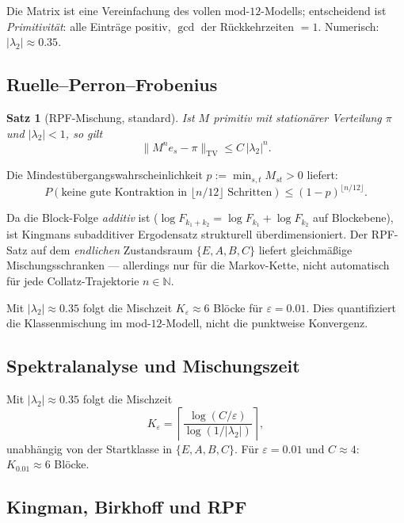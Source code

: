 \documentclass[12pt,a4paper]{article}
\newtheorem{satz}{Satz}[section]
\newcommand{\N}{\mathbb{N}}
\newcommand{\TV}{\mathrm{TV}}
\begin{document}
\begin{tcolorbox}[heuristik]
Die Matrix ist eine Vereinfachung des vollen mod-$12$-Modells;
entscheidend ist \emph{Primitivität}: alle Einträge positiv,
$\gcd$ der Rückkehrzeiten $= 1$.
Numerisch: $|\lambda_2| \approx 0.35$.
\end{tcolorbox}

\subsection{Ruelle--Perron--Frobenius}

\begin{satz}[RPF-Mischung, standard]
Ist $M$ primitiv mit stationärer Verteilung $\pi$ und $|\lambda_2| < 1$, so gilt
\[
  \|M^n e_s - \pi\|_{\TV} \leq C\,|\lambda_2|^n.
\]
\end{satz}

Die Mindestübergangswahrscheinlichkeit $p := \min_{s,t} M_{st} > 0$ liefert:
\[
  P(\text{keine gute Kontraktion in } \lfloor n/12 \rfloor \text{ Schritten})
  \leq (1-p)^{\lfloor n/12 \rfloor}.
\]

\begin{tcolorbox}[kern]
Da die Block-Folge \emph{additiv} ist ($\log F_{k_1+k_2} = \log F_{k_1} + \log F_{k_2}$
auf Blockebene), ist Kingmans subadditiver Ergodensatz strukturell
überdimensioniert. Der RPF-Satz auf dem \emph{endlichen} Zustandsraum
$\{E,A,B,C\}$ liefert gleichmäßige Mischungsschranken --- allerdings nur
für die Markov-Kette, nicht automatisch für jede Collatz-Trajektorie
$n \in \N$.
\end{tcolorbox}

Mit $|\lambda_2| \approx 0.35$ folgt die Mischzeit
$K_\varepsilon \approx 6$ Blöcke für $\varepsilon = 0.01$.
Dies quantifiziert die Klassenmischung im mod-$12$-Modell, nicht die
punktweise Konvergenz.

\subsection{Spektralanalyse und Mischungszeit}

Mit $|\lambda_2| \approx 0.35$ folgt die Mischzeit
\[
  K_\varepsilon = \left\lceil\frac{\log(C/\varepsilon)}{\log(1/|\lambda_2|)}\right\rceil,
\]
unabhängig von der Startklasse in $\{E,A,B,C\}$.
Für $\varepsilon = 0.01$ und $C \approx 4$: $K_{0.01} \approx 6$ Blöcke.

\subsection{Kingman, Birkhoff und RPF}
\end{document}
